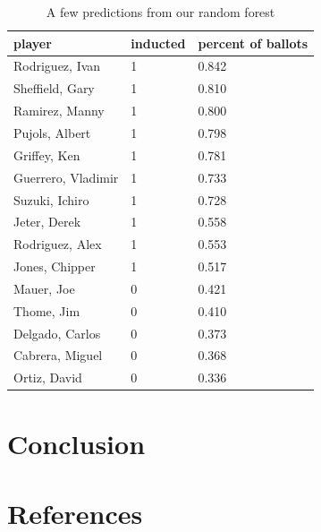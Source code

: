\documentclass[preprint,12pt]{elsarticle}
\begin{document}
\begin{table}[h]
\centering
\begin{tabular}{|l |l |l|}
\hline
player & inducted & percent of ballots\\
\hline
Rodriguez, Ivan & 1 & 0.842 \\
Sheffield, Gary & 1 & 0.810 \\
Ramirez, Manny & 1 & 0.800 \\
Pujols, Albert & 1 & 0.798 \\ 
Griffey, Ken & 1 & 0.781 \\
Guerrero, Vladimir & 1 & 0.733 \\
Suzuki, Ichiro & 1 & 0.728 \\
Jeter, Derek & 1 & 0.558 \\
Rodriguez, Alex & 1 & 0.553 \\
Jones, Chipper & 1 & 0.517 \\
Mauer, Joe & 0 & 0.421 \\
Thome, Jim & 0 & 0.410 \\
Delgado, Carlos & 0 & 0.373 \\
Cabrera, Miguel & 0 & 0.368 \\
Ortiz, David & 0 & 0.336 \\
\hline
\end{tabular}
\caption{A few predictions from our random forest}
\label{rfplayers}
\end{table}


 


\section{Conclusion}


\section{References}








\end{document}
